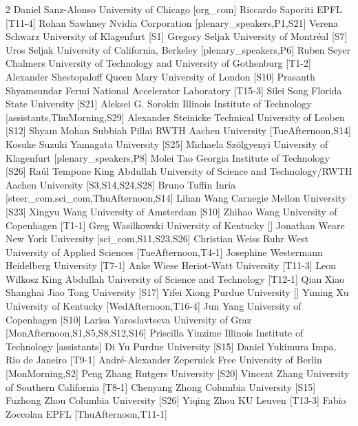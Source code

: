 \begin{multicols}{2}
  {Daniel Sanz-Alonso}
  {University of Chicago}
  [org_com]
\participantne
  {Riccardo Saporiti}
  {EPFL}
  [T11-4]
\participantne
  {Rohan Sawhney}
  {Nvidia Corporation}
  [plenary_speakers,P1,S21]
\participantne
  {Verena Schwarz}
  {University of Klagenfurt}
  [S1]
\participantne
  {Gregory Seljak}
  {University of Montr\'eal}
  [S7]
\participantne
  {Uros Seljak}
  {University of California, Berkeley}
  [plenary_speakers,P6]
\participantne
  {Ruben Seyer}
  {Chalmers University of Technology and University of Gothenburg}
  [T1-2]
\participantne
  {Alexander Shestopaloff}
  {Queen Mary University of London}
  [S10]
\participantne
  {Prasanth Shyamsundar}
  {Fermi National Accelerator Laboratory}
  [T15-3]
\participantne
  {Silei Song}
  {Florida State University}
  [S21]
\participantne
  {Aleksei G. Sorokin}
  {Illinois Institute of Technology}
  [assistants,ThuMorning,S29]
\participantne
  {Alexander Steinicke}
  {Technical University of Leoben}
  [S12]
\participantne
  {Shyam Mohan Subbiah Pillai}
  {RWTH Aachen University}
  [TueAfternoon,S14]
\participantne
  {Kosuke Suzuki}
  {Yamagata University}
  [S25]
\participantne
  {Michaela Sz\"olgyenyi}
  {University of Klagenfurt}
  [plenary_speakers,P8]
\participantne
  {Molei Tao}
  {Georgia Institute of Technology}
  [S26]
\participantne
  {Ra\'ul Tempone}
  {King Abdullah University of Science and Technology/RWTH Aachen University}
  [S3,S14,S24,S28]
\participantne
  {Bruno Tuffin}
  {Inria}
  [steer_com,sci_com,ThuAfternoon,S14]
\participantne
  {Lihan Wang}
  {Carnegie Mellon University}
  [S23]
\participantne
  {Xingyu Wang}
  {University of Amsterdam}
  [S10]
\participantne
  {Zhihao Wang}
  {University of Copenhagen}
  [T1-1]
\participantne
  {Greg Wasilkowski}
  {University of Kentucky}
  []
\participantne
  {Jonathan Weare}
  {New York University}
  [sci_com,S11,S23,S26]
\participantne
  {Christian Weiss}
  {Ruhr West University of Applied Sciences}
  [TueAfternoon,T4-1]
\participantne
  {Josephine Westermann}
  {Heidelberg University}
  [T7-1]
\participantne
  {Anke Wiese}
  {Heriot-Watt University}
  [T11-3]
\participantne
  {Leon Wilkosz}
  {King Abdullah University of Science and Technology}
  [T12-1]
\participantne
  {Qian Xiao}
  {Shanghai Jiao Tong University}
  [S17]
\participantne
  {Yifei Xiong}
  {Purdue University}
  []
\participantne
  {Yiming Xu}
  {University of Kentucky}
  [WedAfternoon,T16-4]
\participantne
  {Jun Yang}
  {University of Copenhagen}
  [S10]
\participantne
  {Larisa Yaroslavtseva}
  {University of Graz}
  [MonAfternoon,S1,S5,S8,S12,S16]
\participantne
  {Priscilla Yinzime}
  {Illinois Institute of Technology}
  [assistants]
\participantne
  {Di Yu}
  {Purdue University}
  [S15]
\participantne
  {Daniel Yukimura}
  {Impa, Rio de Janeiro}
  [T9-1]
\participantne
  {Andr\'e-Alexander Zepernick}
  {Free University of Berlin}
  [MonMorning,S2]
\participantne
  {Peng Zhang}
  {Rutgers University}
  [S20]
\participantne
  {Vincent Zhang}
  {University of Southern California}
  [T8-1]
\participantne
  {Chenyang Zhong}
  {Columbia University}
  [S15]
\participantne
  {Fuzhong Zhou}
  {Columbia University}
  [S26]
\participantne
  {Yiqing Zhou}
  {KU Leuven}
  [T13-3]
\participantne
  {Fabio Zoccolan}
  {EPFL}
  [ThuAfternoon,T11-1]
\end{multicols}
